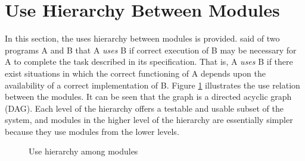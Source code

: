\documentclass[12pt, titlepage]{article}
\begin{document}
\section{Use Hierarchy Between Modules} \label{SecUse}
In this section, the uses hierarchy between modules is
provided. \citet{Parnas1978} said of two programs A and B that A {\em uses} B if
correct execution of B may be necessary for A to complete the task described in
its specification. That is, A {\em uses} B if there exist situations in which
the correct functioning of A depends upon the availability of a correct
implementation of B.  Figure \ref{FigUH} illustrates the use relation between
the modules. It can be seen that the graph is a directed acyclic graph
(DAG). Each level of the hierarchy offers a testable and usable subset of the
system, and modules in the higher level of the hierarchy are essentially simpler
because they use modules from the lower levels.
\begin{figure}[H]
\centering
\caption{Use hierarchy among modules}
\label{FigUH}
\end{figure}



\end{document}
